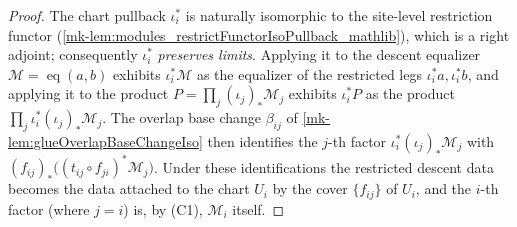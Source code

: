 \begin{proof}
  \leanok
    The chart pullback \(\iota_i^{*}\) is naturally isomorphic to the site-level
  restriction functor (\ref{mk-lem:modules_restrictFunctorIsoPullback_mathlib}), which
  is a right adjoint; consequently \(\iota_i^{*}\) \emph{preserves limits}. Applying
  it to the descent equalizer \(\mathcal{M} = \operatorname{eq}(a,b)\) exhibits
  \(\iota_i^{*}\mathcal{M}\) as the equalizer of the restricted legs
  \(\iota_i^{*}a, \iota_i^{*}b\), and applying it to the product
  \(P = \prod_j (\iota_j)_{*}\mathcal{M}_j\) exhibits \(\iota_i^{*}P\) as the product
  \(\prod_j \iota_i^{*}(\iota_j)_{*}\mathcal{M}_j\). The overlap base change
  \(\beta_{ij}\) of \ref{mk-lem:glueOverlapBaseChangeIso} then identifies the \(j\)-th
  factor \(\iota_i^{*}(\iota_j)_{*}\mathcal{M}_j\) with
  \((f_{ij})_{*}\bigl((t_{ij} \circ f_{ji})^{*}\mathcal{M}_j\bigr)\). Under these
  identifications the restricted descent data becomes the data attached to the chart
  \(U_i\) by the cover \(\{f_{ij}\}\) of \(U_i\), and the \(i\)-th factor (where
  \(j = i\)) is, by (C1), \(\mathcal{M}_i\) itself.


\end{proof}
